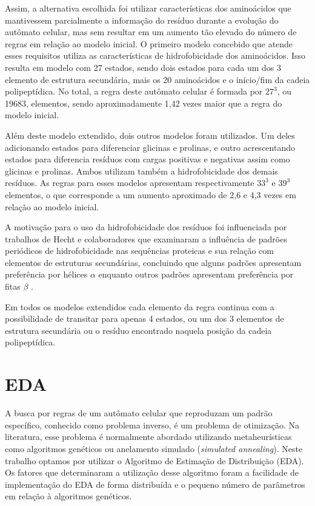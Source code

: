 Assim, a alternativa escolhida foi utilizar características dos aminoácidos que mantivessem parcialmente a informação do resíduo durante a evolução do autômato celular, mas sem resultar em um aumento tão elevado do número de regras em relação ao modelo inicial. O primeiro modelo concebido que atende esses requisitos utiliza as características de hidrofobicidade dos aminoácidos. Isso resulta em modelo com 27 estados, sendo dois estados para cada um dos 3 elemento de estrutura secundária, mais os 20 aminoácidos e o início/fim da cadeia polipeptídica. No total, a regra deste autômato celular é formada por  $27^3$, ou 19683, elementos, sendo aproximadamente 1,42 vezes maior que a regra do modelo inicial.

Além deste modelo extendido, dois outros modelos foram utilizados. Um deles adicionando estados para diferenciar glicinas e prolinas, e outro acrescentando estados para diferencia resíduos com cargas positivas e negativas assim como glicinas e prolinas. Ambos utilizam também a hidrofobicidade dos demais resíduos. As regras para esses modelos apresentam  respectivamente $33^3$ e $39^3$ elementos, o que corresponde a um aumento aproximado de 2,6 e 4,3 vezes em relação ao modelo inicial. 

A motivação para o uso da hidrofobicidade dos resíduos foi influenciada por trabalhos de Hecht e colaboradores \cite{Xiong07, West1995} que examinaram a influência de padrões periódicos de hidrofobicidade nas sequências proteicas e sua relação com elementos de estruturas secundárias, concluindo que alguns padrões apresentam preferência por hélices $\alpha$ enquanto outros padrões apresentam preferência por fitas $\beta$ \cite{West1995}.

Em todos os modelos extendidos cada elemento da regra continua com a possibilidade de transitar para apenas 4 estados, ou um dos 3 elementos de estrutura secundária ou o resíduo encontrado naquela posição da cadeia polipeptídica.

\section{EDA}

A busca por regras de um autômato celular que reproduzam um padrão específico, conhecido como problema inverso, é um problema de otimização. Na literatura, esse problema é normalmente abordado utilizando metaheurísticas como algoritmos genéticos ou anelamento simulado (\textit{simulated annealing}). Neste trabalho optamos por utilizar o Algoritmo de Estimação de Distribuição (EDA). Os fatores que determinaram a utilização desse algoritmo foram a facilidade de implementação do EDA de forma distribuída e o pequeno número de parâmetros em relação à algoritmos genéticos.

